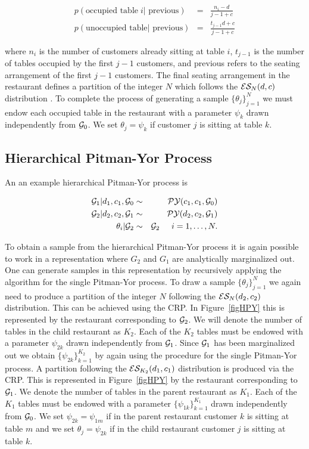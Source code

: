 \begin{eqnarray*}
p(\textrm{occupied table}\; i |\textrm{ previous}) &=& \frac{n_i - d}{j-1+ c}\\
p(\textrm{unoccupied table} | \textrm{ previous}) &=& \frac{t_{j-1}d +c}{j-1+c}
\end{eqnarray*}

where $n_i$ is the number of customers already sitting at table $i$, $t_{j-1}$ is the number of tables occupied by the first $j-1$ customers, and previous refers to the seating arrangement of the first $j-1$ customers.  The final seating arrangement in the restaurant defines a partition of the integer $N$ which follows the $\ES_N(d,c)$ distribution \cite{Pitman1995}.  To complete the process of generating a sample $\{ \theta_j \}_{j = 1}^N$ we must endow each occupied table in the restaurant with a parameter $\psi_k$ drawn independently from $\G_0$.  We set $\theta_j = \psi_k$ if customer $j$ is sitting at table $k$.


\subsection{Hierarchical Pitman-Yor Process}

An an example hierarchical Pitman-Yor process is 

\begin{eqnarray*}
\G_1|d_1, c_1, \G_0 &\sim& \PY(c_1,c_1,\G_0)\\
\G_2 | d_2, c_2, \G_1 &\sim& \PY(d_2,c_2, \G_1)\\
\theta_i | \G_2 &\sim& \G_2 \hspace{.5cm} i = 1,\dots, N.
\end{eqnarray*}

To obtain a sample from the hierarchical Pitman-Yor process it is again possible to work in a representation where $G_2$ and $G_1$ are analytically marginalized out. One can generate samples in this representation by recursively applying the algorithm for the single Pitman-Yor process.  To draw a sample $\{ \theta_j \}_{j = 1}^N$ we again need to produce a partition of the integer $N$ following the $\ES_N(d_2,c_2)$ distribution.  This can be achieved using the CRP.  In Figure~\ref{figHPY} this is represented by the restaurant corresponding to $\G_2$. We will denote the number of tables in the child restaurant as $K_2$.  Each of the $K_2$ tables must be endowed with a parameter $ \psi_{2k}$ drawn independently from $\G_1$.  Since $\G_1$ has been marginalized out we obtain $\{ \psi_{2k} \}_ {k = 1}^{K_2}$ by again using the procedure for the single Pitman-Yor process.  A partition following the $\ES_{K_2}(d_1,c_1)$ distribution is produced via the CRP.  This is represented in Figure~\ref{figHPY} by the restaurant corresponding to $\G_1$. We denote the number of tables in the parent restaurant as $K_1$.   Each of the $K_1$ tables must be endowed with a parameter $\{ \psi_{1k} \}_{ k = 1}^{K_1}$ drawn independently from $\G_0$.  We set $\psi_{2k}  = \psi_{1m}$ if in the parent restaurant customer $k$ is sitting at table $m$ and we set $\theta_j = \psi_{2k}$ if in the child restaurant customer $j$ is sitting at table $k$.


